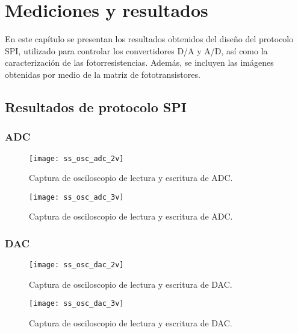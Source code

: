 \chapter{Mediciones y resultados}
En este capítulo se presentan los resultados obtenidos del diseño del protocolo SPI, utilizado para controlar los convertidores D/A y A/D, así como la caracterización de las fotorresistencias. Además, se incluyen las imágenes obtenidas por medio de la matriz de fototransistores.


\section{Resultados de protocolo SPI}

\subsection{ADC}

            \begin{figure}[hbtp]
                \centering
                \texttt{[image: ss\_osc\_adc\_2v]}
                \caption{Captura de osciloscopio de lectura y escritura de ADC.}
                \label{fig:ss_osc_adc_2v}
            \end{figure} 

            \begin{figure}[hbtp]
                \centering
                \texttt{[image: ss\_osc\_adc\_3v]}
                \caption{Captura de osciloscopio de lectura y escritura de ADC.}
                \label{fig:ss_osc_adc_3v}
            \end{figure} 

\newpage     
\subsection{DAC}

            \begin{figure}[hbtp]
                \centering
                \texttt{[image: ss\_osc\_dac\_2v]}
                \caption{Captura de osciloscopio de lectura y escritura de DAC.}
                \label{fig:ss_osc_dac_2v}
            \end{figure}
            
            \begin{figure}[hbtp]
                \centering
                \texttt{[image: ss\_osc\_dac\_3v]}
                \caption{Captura de osciloscopio de lectura y escritura de DAC.}
                \label{fig:ss_osc_dac_3v}
            \end{figure}   
            
